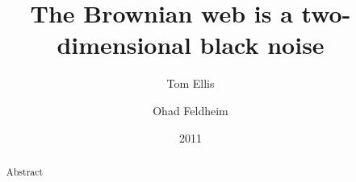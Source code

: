 {
\title{The Brownian web is a two-dimensional black noise}

\author{Tom Ellis\\%
\and Ohad Feldheim}

\date{2011}

\maketitle

\begin{abstract}
Abstract
\end{abstract}

}
